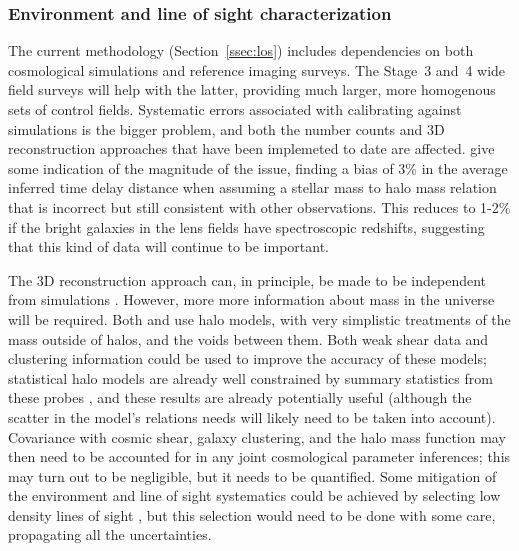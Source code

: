 \subsubsection{Environment and line of sight characterization}

The current methodology (Section~\ref{ssec:los}) includes dependencies
on both cosmological simulations and reference imaging surveys. The
Stage~3 and~4 wide field surveys will help with the latter, providing
much larger, more homogenous sets of control fields.  Systematic
errors associated with calibrating against simulations is the bigger
problem, and both the number counts and 3D reconstruction approaches
that have been implemeted to date are affected.
\citet{CollettEtal2013} give some indication of the magnitude of the
issue, finding a bias of 3\% in the average inferred time delay distance
when assuming a stellar mass to halo mass relation that is incorrect
but still consistent with other observations. This reduces to 1-2\%
if the bright galaxies in the lens fields have spectroscopic redshifts,
suggesting that this kind of data will continue to be important.

The 3D reconstruction approach can, in principle, be made to be
independent from simulations \citep[indeed, this was a design feature
of][]{McCullyEtal2014}.  However, more  more information about mass in
the universe will be required.  Both \citet{McCullyEtal2014} and
\citet{CollettEtal2013} use halo models, with very simplistic treatments
of the mass outside of halos, and the voids between them. Both weak
shear data and clustering information could be used to improve the
accuracy of these  models; statistical halo models are already well
constrained by summary statistics from these probes
\citep[e.g.][]{CouponEtal2015},  and these results are already
potentially useful (although the scatter in the model's relations needs
will likely need to be taken into account).  Covariance with cosmic
shear, galaxy clustering, and the halo mass function may then  need to
be accounted for in any joint cosmological parameter inferences; this
may turn out to be negligible, but it needs to be quantified.  Some
mitigation of the environment and line of sight systematics could be
achieved by selecting low density lines of sight
\citep{CollettEtal2013}, but this selection would need to be done with
some care, propagating all the uncertainties.


